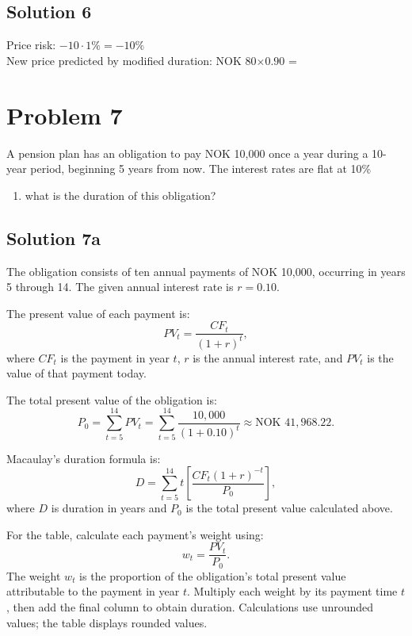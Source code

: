 \documentclass[12]{article}
\begin{document}
\color{blue}
\subsection*{Solution 6}
Price risk: $-10 \cdot 1\% = -10\%$ \\
New price predicted by modified duration: NOK 80$ \times 0.90$ = 



\color{black}
\section*{Problem 7}
A pension plan has an obligation to pay NOK 10,000 once a year during a 10-year period, beginning 5 years from now. The interest rates are flat at 10\%
\begin{enumerate}
     \item[a)] what is the duration of this obligation? 
\end{enumerate}

   

\color{blue}
\subsection*{Solution 7a} 
\noindent The obligation consists of ten annual payments of NOK 10,000, occurring in years 5 through 14. The given annual interest rate is $r=0.10$.

\par\noindent The present value of each payment is:
\[
PV_t=\frac{CF_t}{(1+r)^t},
\]
where $CF_t$ is the payment in year $t$, $r$ is the annual interest rate, and $PV_t$ is the value of that payment today.

\par\noindent The total present value of the obligation is:
\[
P_0=\sum_{t=5}^{14}PV_t
=\sum_{t=5}^{14}\frac{10{,}000}{(1+0.10)^t}
\approx\text{NOK }41{,}968.22.
\]

\par\noindent Macaulay's duration formula is:
\[
D=\sum_{t=5}^{14}t\left[\frac{CF_t(1+r)^{-t}}{P_0}\right],
\]
where $D$ is duration in years and $P_0$ is the total present value calculated above.

\par\noindent For the table, calculate each payment's weight using:
\[
w_t=\frac{PV_t}{P_0}.
\]
The weight $w_t$ is the proportion of the obligation's total present value attributable to the payment in year $t$. Multiply each weight by its payment time $t$, then add the final column to obtain duration. Calculations use unrounded values; the table displays rounded values.
\end{document}
